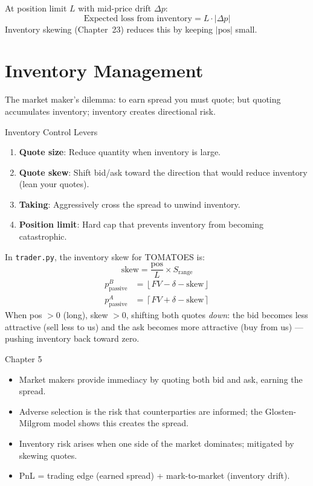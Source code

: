 \documentclass[12pt,a4paper,openany]{report}
\theoremstyle{definition}
\newcommand{\floor}[1]{\left\lfloor#1\right\rfloor}
\newcommand{\ceil}[1]{\left\lceil#1\right\rceil}
\begin{document}
At position limit $L$ with mid-price drift $\Delta p$:
\begin{equation}
  \text{Expected loss from inventory} = L \cdot |\Delta p|
\end{equation}
Inventory skewing (Chapter~23) reduces this by keeping $|\text{pos}|$ small.

\section{Inventory Management}

The market maker's dilemma: to earn spread you must quote; but quoting accumulates inventory; inventory creates directional risk.

\begin{keyconceptbox}{Inventory Control Levers}
\begin{enumerate}[label=\arabic*.]
  \item \textbf{Quote size}: Reduce quantity when inventory is large.
  \item \textbf{Quote skew}: Shift bid/ask toward the direction that would reduce inventory (lean your quotes).
  \item \textbf{Taking}: Aggressively cross the spread to unwind inventory.
  \item \textbf{Position limit}: Hard cap that prevents inventory from becoming catastrophic.
\end{enumerate}
\end{keyconceptbox}

In \texttt{trader.py}, the inventory skew for TOMATOES is:
\begin{equation}
  \text{skew} = \frac{\text{pos}}{L} \times S_{\text{range}}
\end{equation}
\begin{align}
  p^B_{\text{passive}} &= \floor{FV - \delta - \text{skew}} \\
  p^A_{\text{passive}} &= \ceil{FV + \delta - \text{skew}}
\end{align}
When pos $> 0$ (long), skew $> 0$, shifting both quotes \emph{down}: the bid becomes less attractive (sell less to us) and the ask becomes more attractive (buy from us) — pushing inventory back toward zero.

\begin{takeawaybox}{Chapter 5}
\begin{itemize}
  \item Market makers provide immediacy by quoting both bid and ask, earning the spread.
  \item Adverse selection is the risk that counterparties are informed; the Glosten-Milgrom model shows this creates the spread.
  \item Inventory risk arises when one side of the market dominates; mitigated by skewing quotes.
  \item PnL = trading edge (earned spread) + mark-to-market (inventory drift).
\end{itemize}
\end{takeawaybox}
\end{document}
